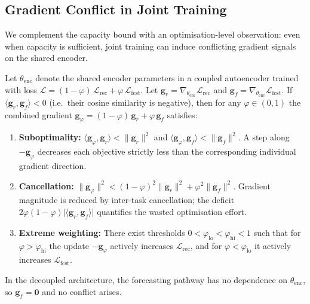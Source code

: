 
\subsection{Gradient Conflict in Joint Training}
\label{sec:gradient-conflict}

We complement the capacity bound with an optimisation-level observation:
even when capacity is sufficient, joint training can induce conflicting
gradient signals on the shared encoder.

\begin{proposition}
\label{prop:gradient-conflict}
Let $\theta_{\mathrm{enc}}$ denote the shared encoder parameters in a
coupled autoencoder trained with loss
$\mathcal{L} = (1{-}\varphi)\,\mathcal{L}_{\mathrm{rec}} +
\varphi\,\mathcal{L}_{\mathrm{fcst}}$.
Let $\mathbf{g}_r = \nabla_{\theta_{\mathrm{enc}}} \mathcal{L}_{\mathrm{rec}}$
and $\mathbf{g}_f = \nabla_{\theta_{\mathrm{enc}}} \mathcal{L}_{\mathrm{fcst}}$.
If $\langle \mathbf{g}_r, \mathbf{g}_f \rangle < 0$
(i.e.\ their cosine similarity is negative), then for any
$\varphi \in (0,1)$ the combined gradient
$\mathbf{g}_\varphi = (1{-}\varphi)\,\mathbf{g}_r + \varphi\,\mathbf{g}_f$
satisfies:
\begin{enumerate}
\item[\emph{(a)}] \textbf{Suboptimality:}
  $\langle \mathbf{g}_\varphi, \mathbf{g}_r \rangle < \lVert \mathbf{g}_r \rVert^2$
  and
  $\langle \mathbf{g}_\varphi, \mathbf{g}_f \rangle < \lVert \mathbf{g}_f \rVert^2$.
  A step along $-\mathbf{g}_\varphi$ decreases each objective strictly less
  than the corresponding individual gradient direction.
\item[\emph{(b)}] \textbf{Cancellation:}
  $\lVert \mathbf{g}_\varphi \rVert^2
  < (1{-}\varphi)^2 \lVert \mathbf{g}_r \rVert^2
  + \varphi^2 \lVert \mathbf{g}_f \rVert^2$.
  Gradient magnitude is reduced by inter-task cancellation;
  the deficit $2\varphi(1{-}\varphi)\lvert\langle\mathbf{g}_r,\mathbf{g}_f\rangle\rvert$
  quantifies the wasted optimisation effort.
\item[\emph{(c)}] \textbf{Extreme weighting:}
  There exist thresholds $0 < \varphi_{\mathrm{lo}} < \varphi_{\mathrm{hi}} < 1$
  such that for $\varphi > \varphi_{\mathrm{hi}}$ the update $-\mathbf{g}_\varphi$
  actively increases $\mathcal{L}_{\mathrm{rec}}$, and for
  $\varphi < \varphi_{\mathrm{lo}}$ it actively increases
  $\mathcal{L}_{\mathrm{fcst}}$.
\end{enumerate}
In the decoupled architecture, the forecasting pathway has no dependence on
$\theta_{\mathrm{enc}}$, so
$\mathbf{g}_f = \mathbf{0}$ and no conflict arises.
\end{proposition}

